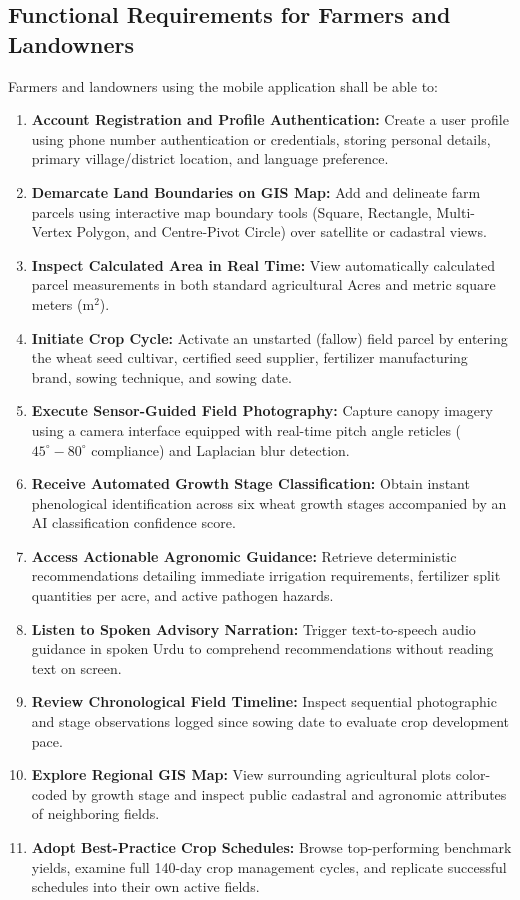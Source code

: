 \subsection{Functional Requirements for Farmers and Landowners}
Farmers and landowners using the mobile application shall be able to:
\begin{enumerate}
    \item \textbf{Account Registration and Profile Authentication:} Create a user profile using phone number authentication or credentials, storing personal details, primary village/district location, and language preference.
    \item \textbf{Demarcate Land Boundaries on GIS Map:} Add and delineate farm parcels using interactive map boundary tools (Square, Rectangle, Multi-Vertex Polygon, and Centre-Pivot Circle) over satellite or cadastral views.
    \item \textbf{Inspect Calculated Area in Real Time:} View automatically calculated parcel measurements in both standard agricultural Acres and metric square meters ($\text{m}^2$).
    \item \textbf{Initiate Crop Cycle:} Activate an unstarted (fallow) field parcel by entering the wheat seed cultivar, certified seed supplier, fertilizer manufacturing brand, sowing technique, and sowing date.
    \item \textbf{Execute Sensor-Guided Field Photography:} Capture canopy imagery using a camera interface equipped with real-time pitch angle reticles ($45^\circ - 80^\circ$ compliance) and Laplacian blur detection.
    \item \textbf{Receive Automated Growth Stage Classification:} Obtain instant phenological identification across six wheat growth stages accompanied by an AI classification confidence score.
    \item \textbf{Access Actionable Agronomic Guidance:} Retrieve deterministic recommendations detailing immediate irrigation requirements, fertilizer split quantities per acre, and active pathogen hazards.
    \item \textbf{Listen to Spoken Advisory Narration:} Trigger text-to-speech audio guidance in spoken Urdu to comprehend recommendations without reading text on screen.
    \item \textbf{Review Chronological Field Timeline:} Inspect sequential photographic and stage observations logged since sowing date to evaluate crop development pace.
    \item \textbf{Explore Regional GIS Map:} View surrounding agricultural plots color-coded by growth stage and inspect public cadastral and agronomic attributes of neighboring fields.
    \item \textbf{Adopt Best-Practice Crop Schedules:} Browse top-performing benchmark yields, examine full 140-day crop management cycles, and replicate successful schedules into their own active fields.
\end{enumerate}

